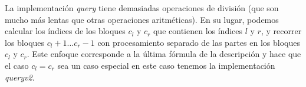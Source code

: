 La implementación \emph{query} tiene demasiadas operaciones de división (que son mucho más lentas que otras operaciones aritméticas). En su lugar, podemos calcular los índices de los bloques $c_l$ y $c_r$ que contienen los índices $l$ y $r$, y recorrer los bloques $c_l+1 \dots c_r-1$ con procesamiento separado de las partes en los bloques $c_l$ y $c_r$. Este enfoque corresponde a la última fórmula de la descripción y hace que el caso $c_l = c_r$ sea un caso especial en este caso tenemos la implementación \emph{queryv2}.